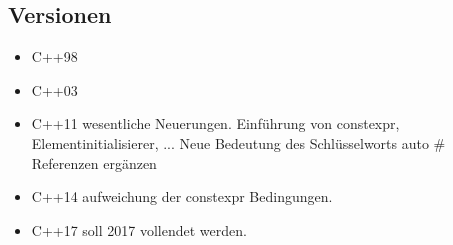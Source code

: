 \documentclass[a4paper]{report}
\begin{document}
\subsection{Versionen}
\begin{itemize}
	\item C++98
	\item C++03
	\item C++11
	\subitem wesentliche Neuerungen. Einführung von constexpr, Elementinitialisierer, ... Neue Bedeutung des Schlüsselworts auto \hspace{3cm} \# Referenzen ergänzen %
	\item C++14
	\subitem aufweichung der constexpr Bedingungen.
	\item C++17
	\subitem soll 2017 vollendet werden.
\end{itemize}
\end{document}
